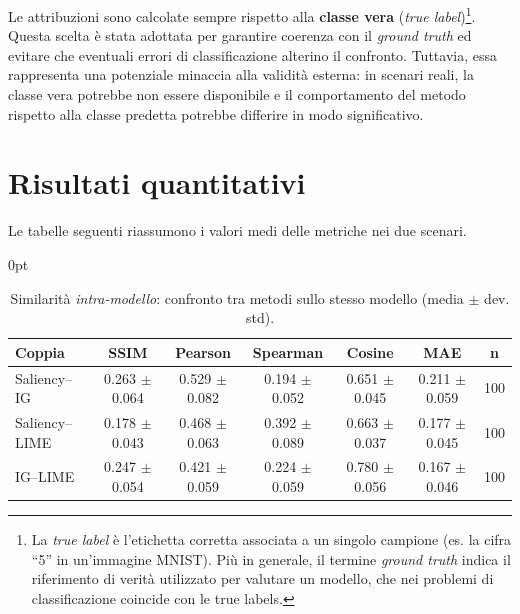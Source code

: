 \documentclass[12pt,a4paper,oneside]{report}
\numberwithin{figure}{chapter}
\numberwithin{table}{chapter}
\newenvironment{tabindent}[1][\parindent]{%
  \begin{table}[H]\begin{adjustwidth}{#1}{0pt}\centering}{%
  \end{adjustwidth}\end{table}}
\begin{document}
Le attribuzioni sono calcolate sempre rispetto alla \textbf{classe vera}
(\textit{true label})\footnote{La \emph{true label} è l’etichetta corretta
      associata a un singolo campione (es. la cifra “5” in un’immagine MNIST). Più in
      generale, il termine \emph{ground truth} indica il riferimento di verità
      utilizzato per valutare un modello, che nei problemi di classificazione
      coincide con le true labels.}. Questa scelta è stata adottata per garantire
coerenza con il \emph{ground truth} ed evitare che eventuali errori di
classificazione alterino il confronto. Tuttavia, essa rappresenta una
potenziale minaccia alla validità esterna: in scenari reali, la classe vera
potrebbe non essere disponibile e il comportamento del metodo rispetto alla
classe predetta potrebbe differire in modo significativo.

\section{Risultati quantitativi}
Le tabelle seguenti riassumono i valori medi delle metriche nei due scenari.

\FloatBarrier
{}

\begin{tabindent}
      \renewcommand{\arraystretch}{1.1}
      \begin{tabular}{lccccc c}
            \hline
            \textbf{Coppia} & \textbf{SSIM}     & \textbf{Pearson}  & \textbf{Spearman} & \textbf{Cosine}   & \textbf{MAE}      & \textbf{n} \\
            \hline
            Saliency–IG     & 0.263 $\pm$ 0.064 & 0.529 $\pm$ 0.082 & 0.194 $\pm$ 0.052 & 0.651 $\pm$ 0.045 & 0.211 $\pm$ 0.059 & 100        \\
            Saliency–LIME   & 0.178 $\pm$ 0.043 & 0.468 $\pm$ 0.063 & 0.392 $\pm$ 0.089 & 0.663 $\pm$ 0.037 & 0.177 $\pm$ 0.045 & 100        \\
            IG–LIME         & 0.247 $\pm$ 0.054 & 0.421 $\pm$ 0.059 & 0.224 $\pm$ 0.059 & 0.780 $\pm$ 0.056 & 0.167 $\pm$ 0.046 & 100        \\
            \hline
      \end{tabular}
      \caption{Similarità \emph{intra-modello}: confronto tra metodi sullo stesso modello (media $\pm$ dev. std).}
      \label{tab:sim_intra}
\end{tabindent}

\vspace{-0.3\baselineskip}
\end{document}
